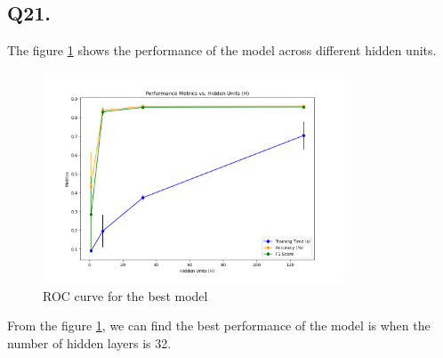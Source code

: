 \documentclass{article}
\begin{document}
\subsection*{Q21.}

The figure \ref{fig:Performance_vs_H} shows the performance of the model across different hidden units.
\begin{figure}[h!]
    \centering
    \includegraphics[width=0.8\textwidth]{./pic/Combined_Performance_vs_H.png}
    \caption{ROC curve for the best model}
    \label{fig:Performance_vs_H}
\end{figure}

From the figure \ref{fig:Performance_vs_H}, we can find the best performance of the model is when the number of hidden layers is 32.
\end{document}

